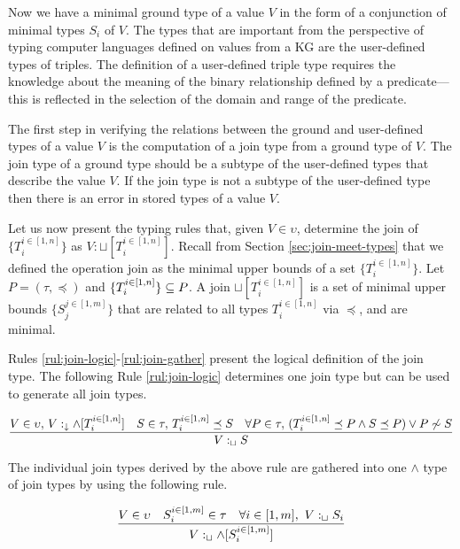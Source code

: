 \documentclass[runningheads]{llncs}
\newcommand{\darr}{\downarrow}
\newcommand{\llb}{\llbracket}
\newcommand{\rrb}{\rrbracket}
\newcommand{\nnotes}[1]{\indent\begin{small}-- \emph{#1}\hfill\break\end{small}}
\newcommand{\ennotes}[1]{\indent\begin{small}-- \emph{#1}\hfill\end{small}}
\begin{document}
Now we have a minimal ground type of a value $V$ in the form of a
conjunction of minimal types $S_i$ of $V$. The types that are
important from the perspective of typing computer languages defined on
values from a KG are the user-defined types of triples. The definition
of a user-defined triple type requires the knowledge about the meaning
of the binary relationship defined by a predicate---this is reflected
in the selection of the domain and range of the predicate.

The first step in verifying the relations between the ground and
user-defined types of a value $V$ is the computation of a join type
from a ground type of $V$. The join type of a ground type should be a
subtype of the user-defined types that describe the value $V$. If the
join type is not a subtype of the user-defined type then there is an
error in stored types of a value $V$.

Let us now present the typing rules that, given $V\in\upsilon$,
determine the join of $\{T_i^{i\in[1,n]}\}$ as
$V:\sqcup[T_i^{i\in[1,n]}]$. Recall from Section
\ref{sec:join-meet-types} that we defined the operation join as the
minimal upper bounds of a set $\{T_i^{i\in[1,n]}\}$. Let
$P=(\tau,\preceq)$ and $\{T_i^{i\in[1,n]}\}\subseteq\/P$. A join
$\sqcup[T_i^{i\in[1,n]}]$ is a set of minimal upper bounds
$\{S_j^{j\in[1,m]}\}$ that are related to all types $T_i^{i\in[1,n]}$
via $\preceq$, and are minimal.


Rules \ref{rul:join-logic}-\ref{rul:join-gather} present the logical
definition of the join type. The following Rule \ref{rul:join-logic}
determines one join type but can be used to generate all join types.


\begin{equation}
\label{rul:join-logic}
\dfrac{V\in\upsilon,\, \/V:_\darr\land[T_i^{i\in[1,n]}]\quad\/S\in\tau,\, T_i^{i\in[1,n]}\preceq\/S\quad\forall\/P\in\tau,\, (T_i^{i\in[1,n]}\preceq\/P\land\/S\preceq\/P)\lor\/P\not\sim\/S}
      {V:_\sqcup\/S}
\end{equation}

The individual join types derived by the above rule are gathered
into one $\land$ type of join types by using the following rule.

\begin{equation}
\label{rul:join-gather}
\dfrac{V\in\upsilon\quad\/S_i^{i\in[1,m]}\in\tau\quad\forall\/i\in[1,m],\ V:_\sqcup\/S_i}
{V:_{\sqcup}\land[S_i^{i\in[1,m]}]}
\end{equation}
\end{document}
